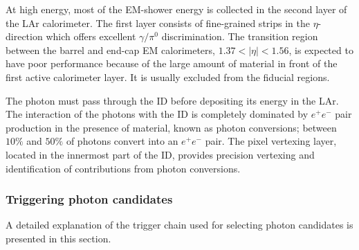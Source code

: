 \documentclass[12pt, twoside]{article}
\numberwithin{equation}{section}
\numberwithin{figure}{section}
\begin{document}
At high energy, most of the EM-shower energy is collected in the second layer of the LAr calorimeter. The first layer consists of fine-grained strips in the $\eta$-direction which offers excellent $\gamma / \pi^{0}$ discrimination. The transition region between the barrel and end-cap EM calorimeters, $1.37 < \left| \eta \right| < 1.56$, is expected to have poor performance because of the large amount of material in front of the first active calorimeter layer. It is usually excluded from the fiducial regions.

The photon must pass through the ID before depositing its energy in the LAr. The interaction of the photons with the ID is completely dominated by $e^{+} e^{-}$ pair production in the presence of material, known as photon conversions; between $10 \% $ and $50 \% $ of photons convert into an $e^{+} e^{-}$ pair. The pixel vertexing layer, located in the innermost part of the ID, provides precision vertexing and identification of contributions from photon conversions.

\newpage
\subsubsection{Triggering photon candidates}
\label{subsubsec:TriggeringPhotonCandidate}

A detailed explanation of the trigger chain used for selecting photon candidates is presented in this section.
\end{document}

